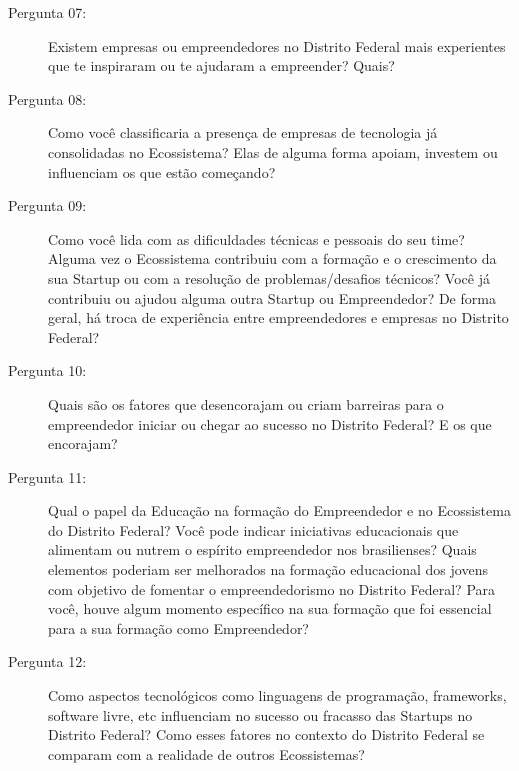 \begin{description}
  \item [Pergunta 07:] Existem empresas ou empreendedores no Distrito Federal mais experientes que te inspiraram ou te ajudaram a empreender? Quais? 

  \item [Pergunta 08:] Como você classificaria a presença de empresas de tecnologia já consolidadas no Ecossistema? Elas de alguma forma apoiam, investem ou influenciam os que estão começando?  
  
  \item [Pergunta 09:] Como você lida com as dificuldades técnicas e pessoais do seu time? Alguma vez o Ecossistema contribuiu com a formação e o crescimento da sua Startup ou com a resolução de problemas/desafios técnicos? Você já contribuiu ou ajudou alguma outra Startup ou Empreendedor? De forma geral, há troca de experiência entre empreendedores e empresas no Distrito Federal? 

  \item [Pergunta 10:] Quais são os fatores que desencorajam ou criam barreiras para o empreendedor iniciar ou chegar ao sucesso no Distrito Federal? E os que encorajam?


  \item [Pergunta 11:] Qual o papel da Educação na formação do Empreendedor e no Ecossistema do Distrito Federal? Você pode indicar iniciativas educacionais que alimentam ou nutrem o espírito empreendedor nos brasilienses? Quais elementos poderiam ser melhorados na formação educacional dos jovens com objetivo de fomentar o empreendedorismo no Distrito Federal? Para você, houve algum momento específico na sua formação que foi essencial para a sua formação como Empreendedor?


  \item [Pergunta 12:] Como aspectos tecnológicos como linguagens de programação, frameworks, software livre, etc influenciam no sucesso ou fracasso das Startups no Distrito Federal? Como esses fatores no contexto do Distrito Federal se comparam com a realidade de outros Ecossistemas? 


\end{description}
